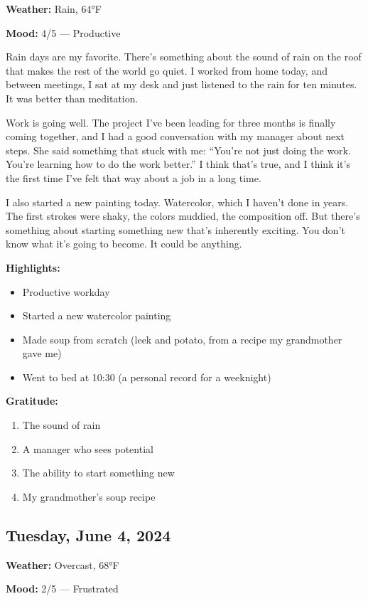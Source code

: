 \documentclass[
    language=english,
    doctype=journal,
    institution=none,
]{../../omnilatex}
\begin{document}
\textbf{Weather:} Rain, 64°F

\textbf{Mood:} 4/5 --- Productive

Rain days are my favorite. There's something about the sound of rain on the roof that makes the rest of the world go quiet. I worked from home today, and between meetings, I sat at my desk and just listened to the rain for ten minutes. It was better than meditation.

Work is going well. The project I've been leading for three months is finally coming together, and I had a good conversation with my manager about next steps. She said something that stuck with me: ``You're not just doing the work. You're learning how to do the work better.'' I think that's true, and I think it's the first time I've felt that way about a job in a long time.

I also started a new painting today. Watercolor, which I haven't done in years. The first strokes were shaky, the colors muddied, the composition off. But there's something about starting something new that's inherently exciting. You don't know what it's going to become. It could be anything.

\textbf{Highlights:}
\begin{itemize}
    \item Productive workday
    \item Started a new watercolor painting
    \item Made soup from scratch (leek and potato, from a recipe my grandmother gave me)
    \item Went to bed at 10:30 (a personal record for a weeknight)
\end{itemize}

\textbf{Gratitude:}
\begin{enumerate}
    \item The sound of rain
    \item A manager who sees potential
    \item The ability to start something new
    \item My grandmother's soup recipe
\end{enumerate}

\subsection{Tuesday, June 4, 2024}

\textbf{Weather:} Overcast, 68°F

\textbf{Mood:} 2/5 --- Frustrated
\end{document}
